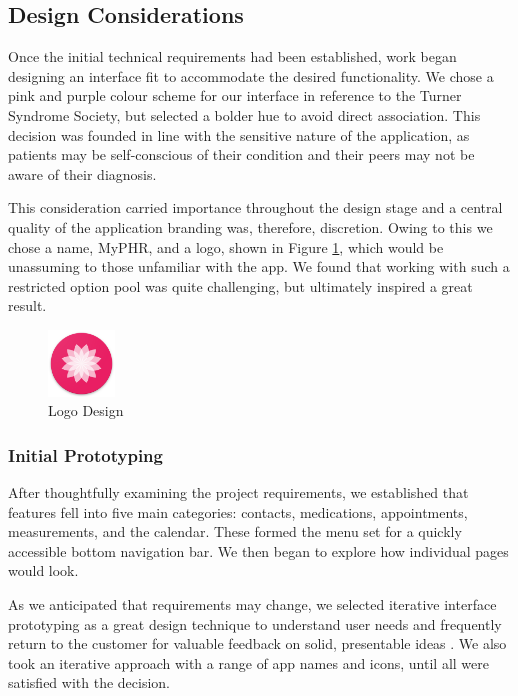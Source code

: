 \documentclass{l3proj}
\begin{document}

\subsection{Design Considerations} \label{sec:3.1}
Once the initial technical requirements had been established, work began designing an interface fit to accommodate the desired functionality. We chose a pink and purple colour scheme for our interface in reference to the Turner Syndrome Society, but selected a bolder hue to avoid direct association. This decision was founded in line with the sensitive nature of the application, as patients may be self-conscious of their condition and their peers may not be aware of their diagnosis.

This consideration carried importance throughout the design stage and a central quality of the application branding was, therefore, discretion. Owing to this we chose a name, MyPHR, and a logo, shown in Figure \ref{fig:logo_design}, which would be unassuming to those unfamiliar with the app. We found that working with such a restricted option pool was quite challenging, but ultimately inspired a great result.

\begin{figure}[ht]
  \centering
  \includegraphics[width=50pt]{figures/logo_design.png}
  \caption{Logo Design}
  \label{fig:logo_design}
\end{figure}


\subsubsection{Initial Prototyping} \label{sec:3.1.1}
After thoughtfully examining the project requirements, we established that features fell into five main categories: contacts, medications, appointments, measurements, and the calendar. These formed the menu set for a quickly accessible bottom navigation bar. We then began to explore how individual pages would look. 

As we anticipated that requirements may change, we selected iterative interface prototyping as a great design technique to understand user needs and frequently return to the customer for valuable feedback on solid, presentable ideas \cite[p347]{psd-notes}. We also took an iterative approach with a range of app names and icons, until all were satisfied with the decision.
\end{document}
